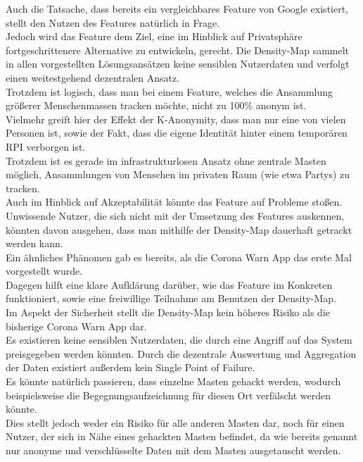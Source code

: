 \documentclass[conference,compsoc]{IEEEtran}
\begin{document}
Auch die Tatsache, dass bereits ein vergleichbares Feature von Google existiert, stellt den Nutzen des Features natürlich in Frage.\\
Jedoch wird das Feature dem Ziel, eine im Hinblick auf Privatsphäre fortgeschrittenere Alternative zu entwickeln, gerecht. 
Die Density-Map sammelt in allen vorgestellten Lösungsansätzen keine sensiblen Nutzerdaten und verfolgt einen weitestgehend dezentralen Ansatz.\\
Trotzdem ist logisch, dass man bei einem Feature, welches die Ansammlung größerer Menschenmassen tracken möchte, nicht zu 100\% anonym ist.\\
Vielmehr greift hier der Effekt der K-Anonymity, dass man nur eine von vielen Personen ist, sowie der Fakt, dass die eigene Identität hinter einem temporären RPI verborgen ist.\\
Trotzdem ist es gerade im infrastrukturlosen Ansatz ohne zentrale Masten möglich, Ansammlungen von Menschen im privaten Raum (wie etwa Partys) zu tracken.\\

Auch im Hinblick auf Akzeptabilität könnte das Feature auf Probleme stoßen.\\
Unwissende Nutzer, die sich nicht mit der Umsetzung des Features auskennen, könnten davon ausgehen, dass man mithilfe der Density-Map dauerhaft getrackt werden kann.\\
Ein ähnliches Phänomen gab es bereits, als die Corona Warn App das erste Mal vorgestellt wurde.\\
Dagegen hilft eine klare Aufklärung darüber, wie das Feature im Konkreten funktioniert, sowie eine freiwillige Teilnahme am Benutzen der Density-Map.\\

Im Aspekt der Sicherheit stellt die Density-Map kein höheres Risiko als die bisherige Corona Warn App dar.\\ 
Es existieren keine sensiblen Nutzerdaten, die durch eine Angriff auf das System preisgegeben werden könnten. Durch die dezentrale Auswertung und Aggregation der Daten existiert außerdem kein Single Point of Failure.\\
Es könnte natürlich passieren, dass einzelne Masten gehackt werden, wodurch beispielsweise die Begegnungsaufzeichnung für diesen Ort verfälscht werden könnte.\\
Dies stellt jedoch weder ein Risiko für alle anderen Masten dar, noch für einen Nutzer, der sich in Nähe eines gehackten Masten befindet, da wie bereits genannt nur anonyme und verschlüsselte Daten mit dem Masten ausgetauscht werden.
\end{document}
